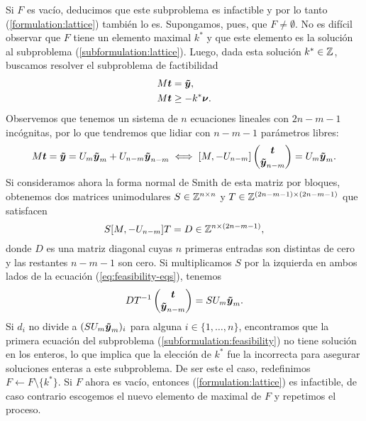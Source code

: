 Si $F$ es vacío, deducimos que este subproblema es infactible y por lo tanto
(\ref{formulation:lattice}) también lo es. Supongamos, pues, que $F \neq \emptyset$. No es difícil
observar que $F$ tiene un elemento maximal $k^*$ y que este elemento es la solución al subproblema
(\ref{subformulation:lattice}). Luego, dada esta solución $k^* \in \mathbb{Z}$, buscamos resolver el
subproblema de factibilidad
\begin{subequations}
	\label{subformulation:feasibility}
	\begin{align}
		M\boldsymbol{t} &= \boldsymbol{\tilde{y}}, \\
		M\boldsymbol{t} &\geq -k^*\boldsymbol{\nu}.
	\end{align}
\end{subequations}
Observemos que tenemos un sistema de $n$ ecuaciones lineales con $2n - m - 1$ incógnitas, por lo que
tendremos que lidiar con $n - m - 1$ parámetros libres:
\begin{align}
	\label{eq:feasibility-eqs}
	M\boldsymbol{t} = \boldsymbol{\tilde{y}} = U_m\boldsymbol{\tilde{y}}_m + U_{n-m}\boldsymbol{\tilde{y}}_{n-m}
   \iff [M, -U_{n-m}] \begin{pmatrix} \boldsymbol{t} \\ \boldsymbol{\tilde{y}}_{n-m} \end{pmatrix} = U_m\boldsymbol{\tilde{y}}_m.
\end{align}
Si consideramos ahora la forma normal de Smith de esta matriz por bloques, obtenemos dos matrices
unimodulares $S \in \mathbb{Z}^{n \times n}$ y $T \in \mathbb{Z}^{(2n - m - 1) \times (2n - m -1)}$ que satisfacen
\begin{equation*}
	S[M, -U_{n-m}]T = D \in \mathbb{Z}^{n \times (2n - m - 1)},
\end{equation*}
donde $D$ es una matriz diagonal cuyas $n$ primeras entradas son distintas de cero y las restantes
$n - m - 1$ son cero. Si multiplicamos $S$ por la izquierda en ambos lados de la ecuación
(\ref{eq:feasibility-eqs}), tenemos
\begin{equation*}
	DT^{-1}\begin{pmatrix} \boldsymbol{t} \\ \boldsymbol{\tilde{y}}_{n-m} \end{pmatrix}
	= SU_m\boldsymbol{\tilde{y}}_{m}.
\end{equation*}
Si $d_i$ no divide a $(SU_m\boldsymbol{\tilde{y}}_{m})_i$ para alguna $i \in \lbrace 1, \ldots, n \rbrace$,
encontramos que la primera ecuación del subproblema (\ref{subformulation:feasibility}) no tiene
solución en los enteros, lo que implica que la elección de $k^*$ fue la incorrecta para asegurar
soluciones enteras a este subproblema. De ser este el caso, redefinimos $F \leftarrow F \setminus
\lbrace k^* \rbrace$. Si $F$ ahora es vacío, entonces (\ref{formulation:lattice}) es
infactible, de caso contrario escogemos el nuevo elemento de maximal de $F$ y repetimos el proceso.

